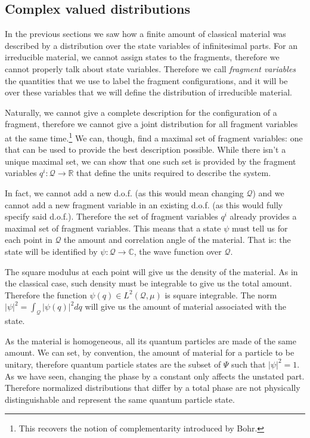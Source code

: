 \documentclass[smallextended]{svjour3}
\numberwithin{equation}{section}
\theoremstyle{definition}
\begin{document}
\subsection{Complex valued distributions}

In the previous sections we saw how a finite amount of classical material was described by a distribution over the state variables of infinitesimal parts. For an irreducible material, we cannot assign states to the fragments, therefore we cannot properly talk about state variables. Therefore we call \emph{fragment variables} the quantities that we use to label the fragment configurations, and it will be over these variables that we will define the distribution of irreducible material.

Naturally, we cannot give a complete description for the configuration of a fragment, therefore we cannot give a joint distribution for all fragment variables at the same time.\footnote{This recovers the notion of complementarity introduced by Bohr.} We can, though, find a maximal set of fragment variables: one that can be used to provide the best description possible. While there isn't a unique maximal set, we can show that one such set is provided by the fragment variables $q^i : \mathcal{Q} \rightarrow \mathbb{R}$ that define the units required to describe the system.

In fact, we cannot add a new d.o.f. (as this would mean changing $\mathcal{Q}$) and we cannot add a new fragment variable in an existing d.o.f. (as this would fully specify said d.o.f.). Therefore the set of fragment variables $q^i$ already provides a maximal set of fragment variables. This means that a state $\psi$ must tell us for each point in $\mathcal{Q}$ the amount and correlation angle of the material. That is: the state will be identified by $\psi : \mathcal{Q} \rightarrow \mathbb{C}$, the wave function over $\mathcal{Q}$.

The square modulus at each point will give us the density of the material. As in the classical case, such density must be integrable to give us the total amount. Therefore the function $\psi(q) \in L^2(\mathcal{Q}, \mu)$ is square integrable. The norm $|\psi|^2 = \int_{\mathcal{Q}} |\psi(q)|^2 dq$ will give us the amount of material associated with the state.

As the material is homogeneous, all its quantum particles are made of the same amount. We can set, by convention, the amount of material for a particle to be unitary, therefore quantum particle states are the subset of $\Psi$ such that $|\psi|^2 = 1$. As we have seen, changing the phase by a constant only affects the unstated part. Therefore normalized distributions that differ by a total phase are not physically distinguishable and represent the same quantum particle state.
\end{document}
